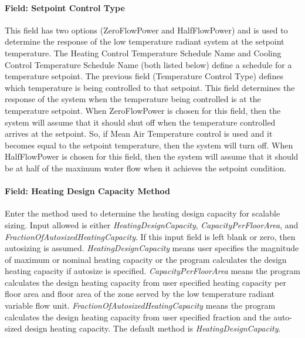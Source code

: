 \paragraph{Field: Setpoint Control Type}\label{field-variable-flow-radiant-system-setpoint-control-type}

This field has two options (ZeroFlowPower and HalfFlowPower) and is used to determine the response of the low temperature radiant system at the setpoint temperature.  The Heating Control Temperature Schedule Name and Cooling Control Temperature Schedule Name (both listed below) define a schedule for a temperature setpoint.  The previous field (Temperature Control Type) defines which temperature is being controlled to that setpoint.  This field determines the response of the system when the temperature being controlled is at the temperature setpoint.  When ZeroFlowPower is chosen for this field, then the system will assume that it should shut off when the temperature controlled arrives at the setpoint.  So, if Mean Air Temperature control is used and it becomes equal to the setpoint temperature, then the system will turn off.  When HalfFlowPower is chosen for this field, then the system will assume that it should be at half of the maximum water flow when it achieves the setpoint condition.

\paragraph{Field: Heating Design Capacity Method}\label{field-heating-design-capacity-method-5}

Enter the method used to determine the heating design capacity for scalable sizing. Input allowed is either \emph{HeatingDesignCapacity}, \emph{CapacityPerFloorArea}, and \emph{FractionOfAutosizedHeatingCapacity}. If this input field is left blank or zero, then autosizing is assumed. \emph{HeatingDesignCapacity} means user specifies the magnitude of maximum or nominal heating capacity or the program calculates the design heating capacity if autosize is specified. \emph{CapacityPerFloorArea} means the program calculates the design heating capacity from user specified heating capacity per floor area and floor area of the zone served by the low temperature radiant variable flow unit. \emph{FractionOfAutosizedHeatingCapacity} means the program calculates the design heating capacity from user specified fraction and the auto-sized design heating capacity. The default method is \emph{HeatingDesignCapacity}.

